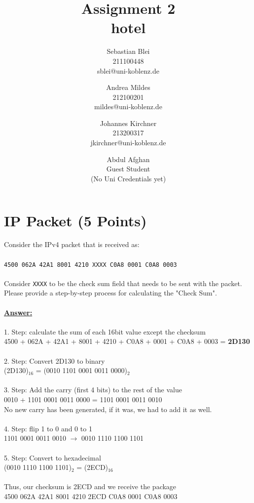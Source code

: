 \documentclass{scrartcl}
\author{%
  Sebastian Blei \\ \normalsize{211100448} \\{\normalsize sblei@uni-koblenz.de} \and
  Andrea Mildes \\ \normalsize{212100201} \\{\normalsize mildes@uni-koblenz.de} \and
  Johannes Kirchner \\ \normalsize{213200317} \\ \normalsize{jkirchner@uni-koblenz.de} \and
  Abdul Afghan \\ \normalsize{Guest Student} \\ \normalsize(No Uni Credentials yet)
}
\title{Assignment 2 \\ hotel}
\date{}
\begin{document}
\maketitle



\section{IP Packet (5 Points)}

Consider the IPv4 packet that is received as:\\ \\
\texttt{4500 062A 42A1 8001 4210 XXXX C0A8 0001 C0A8 0003}\\ \\ 
Consider \texttt{XXXX} to be the check sum field that needs to be sent with the packet.\\
Please provide a step-by-step process for calculating the "Check Sum".\\ \\ 
\textbf{\underline{Answer:}}\\
\\
1. Step: calculate the sum of each 16bit value except the checksum\\
4500 + 062A + 42A1 + 8001 + 4210 + C0A8 + 0001 + C0A8 + 0003 = \textbf{2D130}\\
\\
2. Step: Convert 2D130 to binary\\
(2D130)$_{16}$ = (0010 1101 0001 0011 0000)$_{2}$\\
\\
3. Step: Add the carry (first 4 bits) to the rest of the value\\
0010 + 1101 0001 0011 0000 = 1101 0001 0011 0010\\
No new carry has been generated, if it was, we had to add it as well.\\
\\
4. Step: flip 1 to 0 and 0 to 1\\
1101 0001 0011 0010 $\rightarrow$ 0010 1110 1100 1101\\
\\
5. Step: Convert to hexadecimal\\
(0010 1110 1100 1101)$_{2}$ = (2ECD)$_{16}$\\
\\
Thus, our checksum is 2ECD and we receive the package\\
4500 062A 42A1 8001 4210 2ECD C0A8 0001 C0A8 0003
\end{document}
